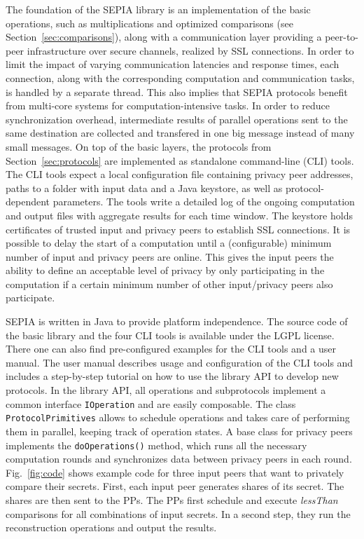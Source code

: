 \documentclass[letterpaper,11pt,onecolumn,titlepage]{article}
\begin{document}
The foundation of the SEPIA library is an implementation of the basic operations, such as multiplications and optimized comparisons 
(see Section~\ref{sec:comparisons}), along
with a communication layer providing a peer-to-peer infrastructure over secure channels, realized by
SSL connections.
In order to limit the impact of varying communication latencies and response
times, each connection, along with the corresponding computation and communication tasks, is
handled by a separate thread. This also implies that SEPIA protocols benefit from multi-core systems for computation-intensive tasks.
In order to reduce synchronization overhead, intermediate results of parallel operations sent to the same destination are collected and transfered in one big message instead of many small messages.
On top of the basic layers, the protocols from Section~\ref{sec:protocols} are implemented as standalone command-line (CLI) tools. 
The CLI tools expect a local configuration file containing privacy peer addresses, paths to a folder with input data and a Java keystore, as well as protocol-dependent parameters. 
The tools write a detailed log of the ongoing computation and output files with aggregate results for each time window.
The keystore holds certificates of trusted input and privacy peers to establish SSL connections.
It is possible to delay the start of a computation until a (configurable) minimum number of input and privacy peers are online. 
This gives the input peers the ability to define an acceptable level of privacy by 
only participating in the computation if a certain minimum number of other input/privacy peers also participate.



SEPIA is written in Java to provide platform independence. 
The source code of the basic library and the four CLI tools is available under the LGPL license. 
There one can also find pre-configured examples for the CLI tools and a user manual. The user manual describes usage and configuration of the CLI tools and includes a step-by-step
tutorial on how to use the library API to develop new protocols.
In the library API, all operations and subprotocols implement a common interface 
\texttt{IOperation} and are easily composable. The class \texttt{Protocol\-Primitives} 
allows to schedule operations and takes care of performing them in parallel, keeping track of operation states. A base class for privacy peers 
implements the \texttt{doOperations()} method, which runs all the necessary computation rounds
and synchronizes data between privacy peers in each round. Fig.~\ref{fig:code} shows example code for three input peers that want to privately compare their secrets.
First, each input peer generates shares of its secret. The shares are then sent to the PPs. The PPs first schedule and execute \emph{lessThan} comparisons for all combinations of input secrets. In a second step, they run the reconstruction operations and output the results.
\end{document}
